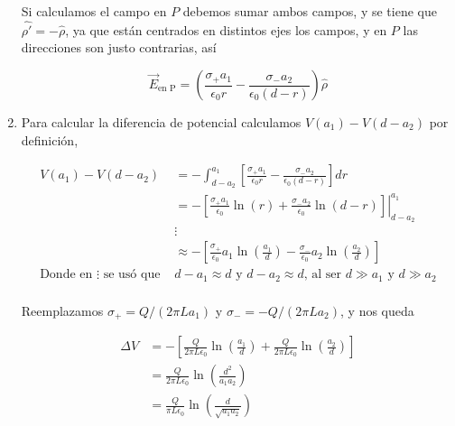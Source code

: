 \begin{enumerate}[label=\alph*)]
    Si calculamos el campo en $P$ debemos sumar ambos campos, y se tiene que $\hat{\rho'} = - \hat{\rho}$, ya que están centrados en distintos ejes los campos, y en $P$ las direcciones son justo contrarias, así
    
    \[\Vec{E}_{\text{en P}} = \left( \frac{\sigma_+ a_1}{\epsilon_0 r} - \frac{\sigma_- a_2}{\epsilon_0 (d-r)} \right)\hat{\rho}\]
    
    \item Para calcular la diferencia de potencial calculamos $V(a_1) - V(d - a_2)$ por definición,
    
    \begin{equation}
        \begin{split}
            V(a_1) - V(d - a_2) &= -\int_{d-a_2}^{a_1}\left[ \frac{\sigma_+ a_1}{\epsilon_0 r} - \frac{\sigma_- a_2}{\epsilon_0 (d-r)} \right]dr\\
            &= -\left.\left[ \frac{\sigma_+ a_1}{\epsilon_0}\ln{(r)} + \frac{\sigma_- a_2}{\epsilon_0}\ln{(d-r)} \right]\right\rvert_{d-a_2}^{a_1}\\
            &\vdots \quad\\ 
            &\approx -\left[ \frac{\sigma_+}{\epsilon_0}a_1\ln{\left( \frac{a_1}{d} \right)} - \frac{\sigma_-}{\epsilon_0}a_2\ln{\left( \frac{a_2}{d} \right)} \right]\\
            \text{Donde en } \vdots \text{ se usó que } &d-a_1 \approx d\text{ y } d-a_2 \approx d\text{, al ser }d \gg a_1\text{ y } d \gg a_2\\
        \end{split}
        \nonumber
    \end{equation}
    
    Reemplazamos $\sigma_+ = Q/(2\pi La_1)$ y $\sigma_- = -Q/(2\pi La_2)$, y nos queda
    
    \begin{equation}
        \begin{split}
            \Delta V &= -\left[ \frac{Q}{2 \pi L\epsilon_0}\ln{\left( \frac{a_1}{d} \right)} + \frac{Q}{2 \pi L\epsilon_0}\ln{\left( \frac{a_2}{d} \right)} \right]\\
            &=\frac{Q}{2 \pi L \epsilon_0}\ln{\left( \frac{d^2}{a_1a_2} \right)}\\
            &=\frac{Q}{\pi L \epsilon_0}\ln{\left( \frac{d}{\sqrt{a_1a_2}} \right)}
        \end{split}
        \nonumber
    \end{equation}
    

\end{enumerate}

